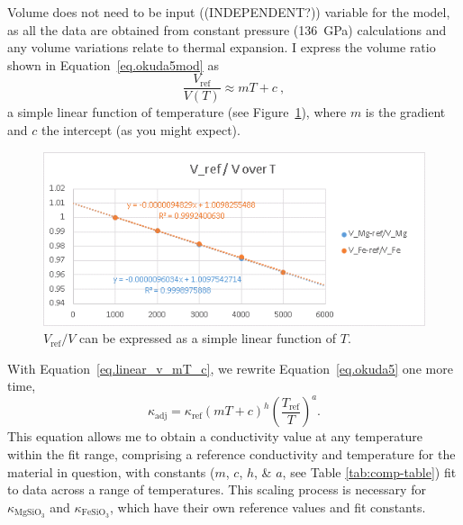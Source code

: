 Volume does not need to be input ((INDEPENDENT?)) variable for the model, as all the data are obtained from constant pressure (136~GPa) calculations and any volume variations relate to thermal expansion. I express the volume ratio shown in Equation~\ref{eq.okuda5mod} as 
%
\begin{equation}
\frac{V_{\mathrm{ref}}}{V(T)} \approx  mT+c \ ,
\label{eq.linear_v_mT_c}
\end{equation}
%
a simple linear function of temperature (see Figure~\ref{fig:draft_VrefV-T}), where $m$ is the gradient and $c$ the intercept (as you might expect). 

\begin{figure}[h!]
  \includegraphics[width=\linewidth]{Figures/draft_VrefV-T.png}
  \caption{$V_{\mathrm{ref}}/V$ can be expressed as a simple linear function of $T$.}
  \label{fig:draft_VrefV-T}
\end{figure}

With Equation~\ref{eq.linear_v_mT_c}, we rewrite Equation~\ref{eq.okuda5} one more time,
%
\begin{equation}
\kappa_{\mathrm{adj}}=\kappa_{\mathrm{ref}} \left ( mT+c \right )^{h} \left ( \frac{T_{\mathrm{ref}}}{T} \right )^{a}.
\label{eq.okuda5modmod}
\end{equation}
%
This equation allows me to obtain a conductivity value at any temperature within the fit range, comprising a reference conductivity and temperature for the material in question, with constants ($m$, $c$, $h$, \& $a$, see Table \ref{tab:comp-table}) fit to data across a range of temperatures. This scaling process is necessary for $\kappa_{\mathrm{MgSiO_{3}}}$ and $\kappa_{\mathrm{FeSiO_{3}}}$, which have their own reference values and fit constants.

